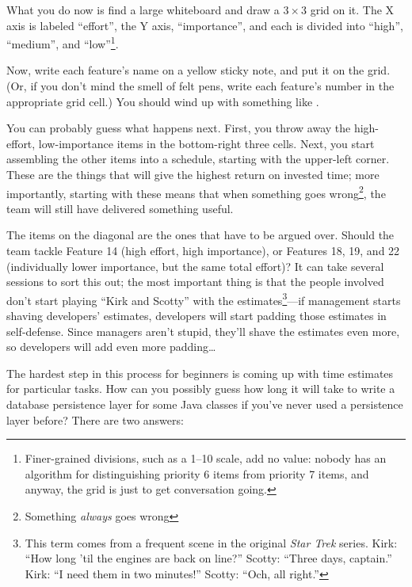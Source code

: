 \documentclass{report}
\begin{document}
What you do now is find a large whiteboard and draw a $3{\times}3$
grid on it.  The X axis is labeled ``effort'', the Y axis,
``importance'', and each is divided into ``high'', ``medium'', and
``low''\footnote{Finer-grained divisions, such as a 1--10 scale, add
no value: nobody has an algorithm for distinguishing priority 6 items
from priority 7 items, and anyway, the grid is just to get
conversation going.}.

Now, write each feature's name on a yellow sticky note, and put it on
the grid.  (Or, if you don't mind the smell of felt pens, write each
feature's number in the appropriate grid cell.)  You should wind up
with something like .

\begin{figure}
\end{figure}

You can probably guess what happens next.  First, you throw away the
high-effort, low-importance items in the bottom-right three
cells. Next, you start assembling the other items into a schedule,
starting with the upper-left corner.  These are the things that will
give the highest return on invested time; more importantly, starting
with these means that when something goes wrong\footnote{Something
\emph{always} goes wrong}, the team will still have delivered
something useful.

The items on the diagonal are the ones that have to be argued
over. Should the team tackle Feature 14 (high effort, high
importance), or Features 18, 19, and 22 (individually lower
importance, but the same total effort)?  It can take several sessions
to sort this out; the most important thing is that the people involved
don't start playing ``Kirk and Scotty'' with the
estimates\footnote{This term comes from a frequent scene in the
original \emph{Star Trek} series.  Kirk: ``How long 'til the engines
are back on line?''  Scotty: ``Three days, captain.''  Kirk: ``I need
them in two minutes!''  Scotty: ``Och, all right.''}---if management
starts shaving developers' estimates, developers will start padding
those estimates in self-defense.  Since managers aren't stupid,
they'll shave the estimates even more, so developers will add even
more padding{\ldots}

The hardest step in this process for beginners is coming up with time
estimates for particular tasks.  How can you possibly guess how long
it will take to write a database persistence layer for some Java
classes if you've never used a persistence layer before?  There are
two answers:
\end{document}

